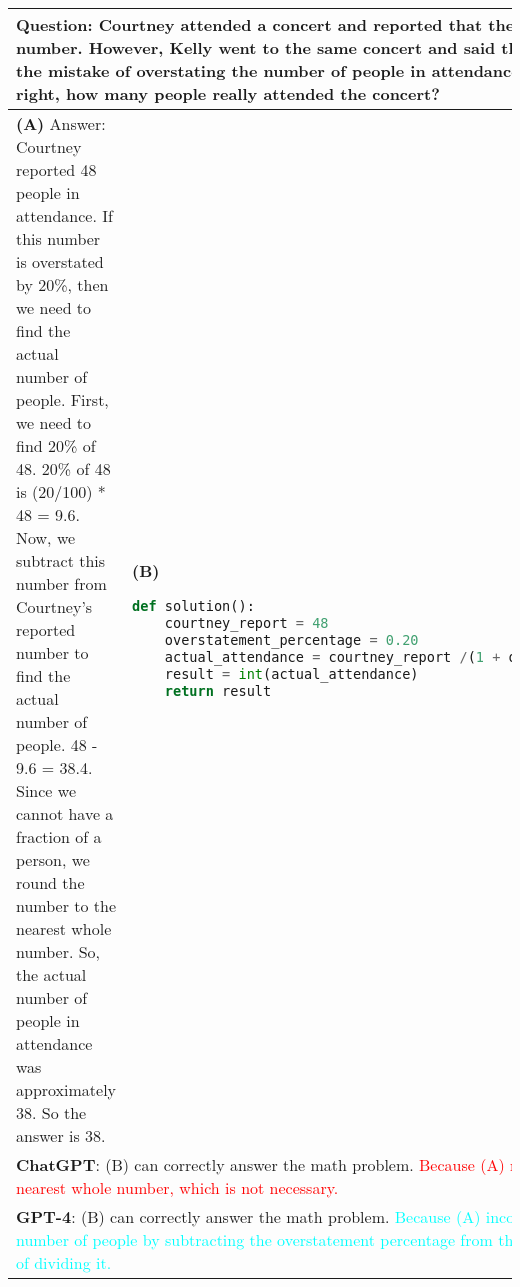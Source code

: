 \documentclass[11pt]{article}
\begin{document}
\begin{table*}[t]
    \centering
    \begin{tabular}{p{}|p{}}
    \toprule
     \multicolumn{2}{p{0.92\textwidth}}{\footnotesize \textbf{Question}: Courtney attended a concert and reported that the audience was 48 in number. However, Kelly went to the same concert and said that Courtney had made the mistake of overstating the number of people in attendance by 20\%. If Kelly was right, how many people really attended the concert?} \\
    \midrule
    \footnotesize \textbf{(A)} 
    \newline
    \footnotesize Answer: \newline
     \footnotesize Courtney reported 48 people in attendance.\newline
     \footnotesize If this number is overstated by 20\%, then we need to find the actual number of people.\newline
     \footnotesize First, we need to find 20\% of 48.\newline
     \footnotesize 20\% of 48 is (20/100) * 48 = 9.6. \newline
     \footnotesize Now, we subtract this number from Courtney's reported number to find the actual number of people.\newline
     \footnotesize 48 - 9.6 = 38.4.\newline
     \footnotesize Since we cannot have a fraction of a person, we round the number to the nearest whole number.\newline
     \footnotesize So, the actual number of people in attendance was approximately 38.\newline
     \footnotesize So the answer is 38.
     & 
     \footnotesize \textbf{(B)}
\lstset{style=mystyle}
     \begin{lstlisting}[language=Python]
def solution():
    courtney_report = 48
    overstatement_percentage = 0.20
    actual_attendance = courtney_report /(1 + overstatement_percentage)
    result = int(actual_attendance)
    return result
     \end{lstlisting}\\
     \midrule
\multicolumn{2}{p{0.92\textwidth}}{\footnotesize \textbf{ChatGPT}: (B) can correctly answer the math problem. \textcolor{red}{Because (A) rounds up the result to the nearest whole number, which is not necessary.}}\\
      \midrule
      \multicolumn{2}{p{0.92\textwidth}}{\footnotesize \textbf{GPT-4}: (B) can correctly answer the math problem. \textcolor{cyan}{Because (A) incorrectly calculated the actual number of people by subtracting the overstatement percentage from the reported number instead of dividing it.}}
     

\end{tabular}
\end{table*}
\end{document}
